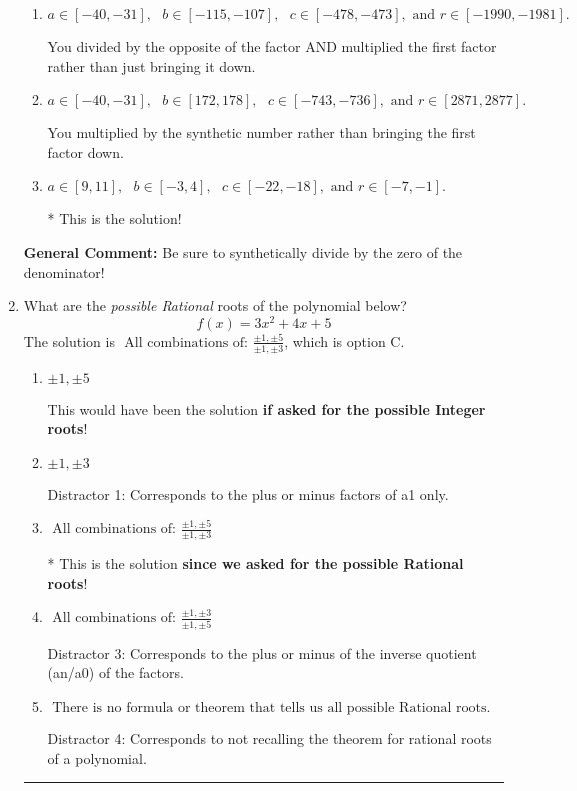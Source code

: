 \documentclass{extbook}[14pt]
\newcommand{\litem}[1]{\item #1

\rule{\textwidth}{0.4pt}}
\begin{document}
\begin{enumerate}
{\begin{enumerate}[label=\Alph*.]
 You multiplied by the synthetic number and subtracted rather than adding during synthetic division.
\item \( a \in [-40, -31], \text{   } b \in [-115, -107], \text{   } c \in [-478, -473], \text{   and   } r \in [-1990, -1981]. \)

 You divided by the opposite of the factor AND multiplied the first factor rather than just bringing it down.
\item \( a \in [-40, -31], \text{   } b \in [172, 178], \text{   } c \in [-743, -736], \text{   and   } r \in [2871, 2877]. \)

 You multiplied by the synthetic number rather than bringing the first factor down.
\item \( a \in [9, 11], \text{   } b \in [-3, 4], \text{   } c \in [-22, -18], \text{   and   } r \in [-7, -1]. \)

* This is the solution!
\end{enumerate}

\textbf{General Comment:} Be sure to synthetically divide by the zero of the denominator!
}
\litem{
What are the \textit{possible Rational} roots of the polynomial below?
\[ f(x) = 3x^{2} +4 x + 5 \]The solution is \( \text{ All combinations of: }\frac{\pm 1,\pm 5}{\pm 1,\pm 3} \), which is option C.\begin{enumerate}[label=\Alph*.]
\item \( \pm 1,\pm 5 \)

This would have been the solution \textbf{if asked for the possible Integer roots}!
\item \( \pm 1,\pm 3 \)

 Distractor 1: Corresponds to the plus or minus factors of a1 only.
\item \( \text{ All combinations of: }\frac{\pm 1,\pm 5}{\pm 1,\pm 3} \)

* This is the solution \textbf{since we asked for the possible Rational roots}!
\item \( \text{ All combinations of: }\frac{\pm 1,\pm 3}{\pm 1,\pm 5} \)

 Distractor 3: Corresponds to the plus or minus of the inverse quotient (an/a0) of the factors. 
\item \( \text{ There is no formula or theorem that tells us all possible Rational roots.} \)

 Distractor 4: Corresponds to not recalling the theorem for rational roots of a polynomial.
\end{enumerate}

}
\end{enumerate}
\end{document}
